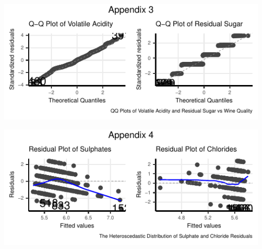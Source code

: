 \documentclass[letterpaper,8pt,twocolumn,twoside,]{pinp}
\begin{document}
\begin{center}\includegraphics{DATA2002_ExecutiveSummary_files/figure-latex/unnamed-chunk-4-3} \end{center}

\begin{center}\includegraphics{DATA2002_ExecutiveSummary_files/figure-latex/unnamed-chunk-4-4} \end{center}

\end{document}
